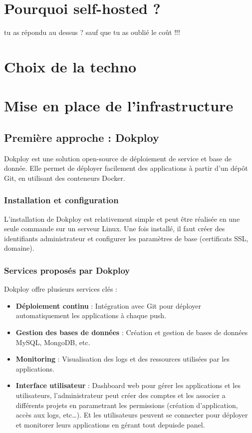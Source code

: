\documentclass{report} %
\begin{document}
\chapter{Pourquoi self-hosted ?}

{\color{red} tu as répondu au dessus ?  sauf que tu as oublié le coût !!!}

\chapter{Choix de la techno}



\chapter{Mise en place de l'infrastructure}

\section{Première approche : Dokploy}
Dokploy est une solution open-source de déploiement de service et base de donnée. %
Elle permet de déployer facilement des applications à partir d’un dépôt Git, en utilisant des conteneurs Docker.

\subsection{Installation et configuration}
L’installation de Dokploy est relativement simple et peut être réalisée en une seule commande sur un serveur Linux.
Une fois installé, il faut créer des identifiants administrateur et configurer les paramètres de base (certificats SSL, domaine).

\subsection{Services proposés par Dokploy}
Dokploy offre plusieurs services clés :
\begin{itemize}
\item \textbf{Déploiement continu} : Intégration avec Git pour déployer automatiquement les applications à chaque push.
\item \textbf{Gestion des bases de données} : Création et gestion de bases de données MySQL, MongoDB, etc.
\item \textbf{Monitoring} : Visualisation des logs et des ressources utilisées par les applications.
\item \textbf{Interface utilisateur} : Dashboard web pour gérer les applications et les utilisateurs, 
l'administrateur peut créer des comptes et les associer a différents projets en parametrant 
les permissions (création d'application, accès aux logs, etc\dots).
Et les utilisateurs peuvent se connecter pour déployer et monitorer leurs applications en gérant tout depuisde panel.
\end{itemize}
\end{document}
